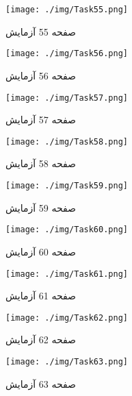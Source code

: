 { 
\begin{figure}[htpb]
\centering
\texttt{[image: ./img/Task55.png]}
\caption{ صفحه 55 آزمایش }
\label{fig:Task55}
\end{figure}
 
 
\begin{figure}[htpb]
\centering
\texttt{[image: ./img/Task56.png]}
\caption{ صفحه 56 آزمایش }
\label{fig:Task56}
\end{figure}
 
 
\begin{figure}[htpb]
\centering
\texttt{[image: ./img/Task57.png]}
\caption{ صفحه 57 آزمایش }
\label{fig:Task57}
\end{figure}
 
 
\begin{figure}[htpb]
\centering
\texttt{[image: ./img/Task58.png]}
\caption{ صفحه 58 آزمایش }
\label{fig:Task58}
\end{figure}
 
 
\begin{figure}[htpb]
\centering
\texttt{[image: ./img/Task59.png]}
\caption{ صفحه 59 آزمایش }
\label{fig:Task59}
\end{figure}
 
 
\begin{figure}[htpb]
\centering
\texttt{[image: ./img/Task60.png]}
\caption{ صفحه 60 آزمایش }
\label{fig:Task60}
\end{figure}
 
 
\begin{figure}[htpb]
\centering
\texttt{[image: ./img/Task61.png]}
\caption{ صفحه 61 آزمایش }
\label{fig:Task61}
\end{figure}
 
 
\begin{figure}[htpb]
\centering
\texttt{[image: ./img/Task62.png]}
\caption{ صفحه 62 آزمایش }
\label{fig:Task62}
\end{figure}
 
 
\begin{figure}[htpb]
\centering
\texttt{[image: ./img/Task63.png]}
\caption{ صفحه 63 آزمایش }
\label{fig:Task63}
\end{figure}
 
}
